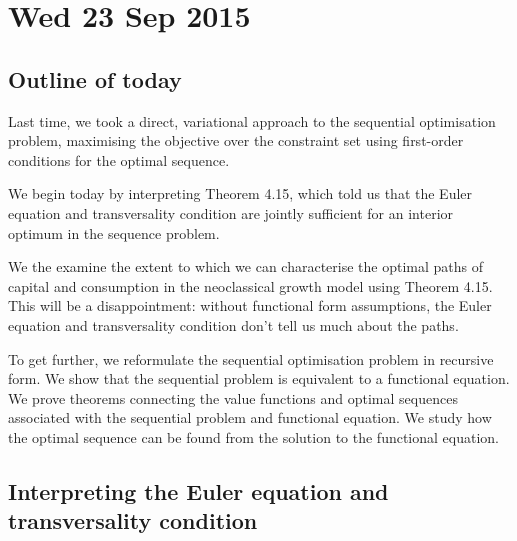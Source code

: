 \documentclass[11pt,letterpaper,reqno,oneside]{article}
\begin{document}
\pagebreak
\section{Wed 23 Sep 2015}
\label{sec:23Sep2015}


\subsection{Outline of today}
\label{sec:23Sep2015:outline_of_today}

Last time, we took a direct, variational approach to the sequential optimisation problem, maximising the objective over the constraint set using first-order conditions for the optimal sequence.

We begin today by interpreting Theorem 4.15, which told us that the Euler equation and transversality condition are jointly sufficient for an interior optimum in the sequence problem.

We the examine the extent to which we can characterise the optimal paths of capital and consumption in the neoclassical growth model using Theorem 4.15. This will be a disappointment: without functional form assumptions, the Euler equation and transversality condition don't tell us much about the paths.

To get further, we reformulate the sequential optimisation problem in recursive form. We show that the sequential problem is equivalent to a functional equation. We prove theorems connecting the value functions and optimal sequences associated with the sequential problem and functional equation. We study how the optimal sequence can be found from the solution to the functional equation.



\subsection{Interpreting the Euler equation and transversality condition}
\label{sec:23Sep2015:interpreting_Euler_transversality}
\end{document}
